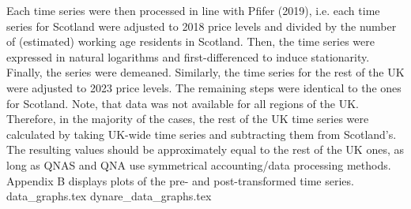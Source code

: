 Each time series were then processed in line with Pfifer (2019), i.e. each time series for Scotland were adjusted to 2018 price levels and divided by the number of (estimated) working age residents in Scotland. Then, the time series were expressed in natural logarithms and first-differenced to induce stationarity. Finally, the series were demeaned. Similarly, the time series for the rest of the UK were adjusted to 2023 price levels. The remaining steps were identical to the ones for Scotland. Note, that data was not available for all regions of the UK. Therefore, in the majority of the cases, the rest of the UK time series were calculated by taking UK-wide time series and subtracting them from Scotland's. The resulting values should be approximately equal to the rest of the UK ones, as long as QNAS and QNA use symmetrical accounting/data processing methods. Appendix B displays plots of the pre- and post-transformed time series.
{data_graphs.tex}
{dynare_data_graphs.tex}


